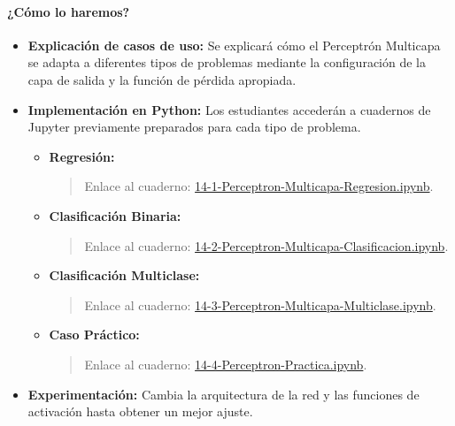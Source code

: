 \documentclass[a4,11pt]{aleph-notas}
\begin{document}
\paragraph{¿Cómo lo haremos?}  
\begin{itemize}[leftmargin=*]
    \item \textbf{Explicación de casos de uso:}
    Se explicará cómo el Perceptrón Multicapa se adapta a diferentes tipos de problemas mediante la configuración de la capa de salida y la función de pérdida apropiada.
    
    \item \textbf{Implementación en Python:} Los estudiantes accederán a cuadernos de Jupyter previamente preparados para cada tipo de problema.
    \begin{itemize}
        \item \textbf{Regresión:}
        \begin{quote}
            Enlace al cuaderno: \href{https://github.com/andres-merino/AprendizajeAutomaticoInicial-05-N0105/blob/main/2-Notebooks/14-1-Perceptron-Multicapa-Regresion.ipynb}{14-1-Perceptron-Multicapa-Regresion.ipynb}.
        \end{quote}
        
        \item \textbf{Clasificación Binaria:}
        \begin{quote}
            Enlace al cuaderno: \href{https://github.com/andres-merino/AprendizajeAutomaticoInicial-05-N0105/blob/main/2-Notebooks/14-2-Perceptron-Multicapa-Clasificacion.ipynb}{14-2-Perceptron-Multicapa-Clasificacion.ipynb}.
        \end{quote}
        
        \item \textbf{Clasificación Multiclase:}
        \begin{quote}
            Enlace al cuaderno: \href{https://github.com/andres-merino/AprendizajeAutomaticoInicial-05-N0105/blob/main/2-Notebooks/14-3-Perceptron-Multicapa-Multiclase.ipynb}{14-3-Perceptron-Multicapa-Multiclase.ipynb}.
        \end{quote}
        
        \item \textbf{Caso Práctico:}
        \begin{quote}
            Enlace al cuaderno: \href{https://github.com/andres-merino/AprendizajeAutomaticoInicial-05-N0105/blob/main/2-Notebooks/14-4-Perceptron-Practica.ipynb}{14-4-Perceptron-Practica.ipynb}.
        \end{quote}
    \end{itemize}
    
    \item \textbf{Experimentación:} Cambia la arquitectura de la red y las funciones de activación hasta obtener un mejor ajuste.
    
\end{itemize}
\end{document}
